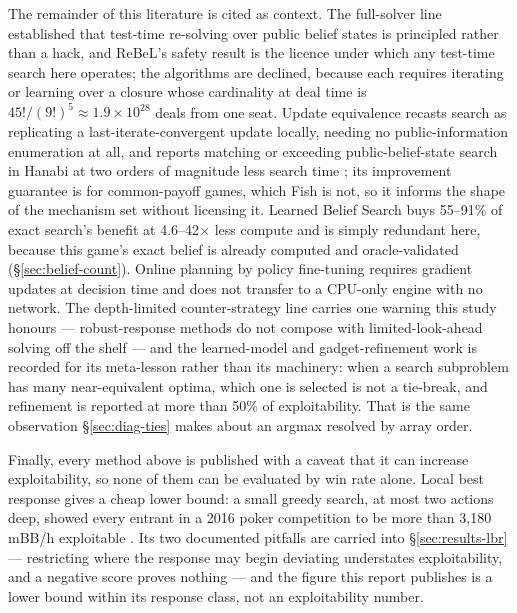 The remainder of this literature is cited as context. The full-solver line
\cite{moravcik2017deepstack,brown2020rebel,schmid2023sog} established that
test-time re-solving over public belief states is principled rather than a hack,
and ReBeL's safety result is the licence under which any test-time search here
operates; the algorithms are declined, because each requires iterating or
learning over a closure whose cardinality at deal time is
$45!/(9!)^5 \approx 1.9 \times 10^{28}$ deals from one seat. Update equivalence
recasts search as replicating a last-iterate-convergent update locally, needing
no public-information enumeration at all, and reports matching or exceeding
public-belief-state search in Hanabi at two orders of magnitude less search time
\cite{sokota2024updateequivalence}; its improvement guarantee is for
common-payoff games, which Fish is not, so it informs the shape of the mechanism
set without licensing it. Learned Belief Search buys 55--91\% of exact search's
benefit at 4.6--42$\times$ less compute \cite{hu2021lbs} and is simply redundant
here, because this game's exact belief is already computed and oracle-validated
(\S\ref{sec:belief-count}). Online planning by policy fine-tuning
\cite{fickinger2021rlfinetuning} requires gradient updates at decision time and
does not transfer to a CPU-only engine with no network. The depth-limited
counter-strategy line \cite{milec2021cdr,milec2025abd} carries one warning this
study honours --- robust-response methods do not compose with limited-look-ahead
solving off the shelf --- and the learned-model and gadget-refinement work
\cite{kubicek2025lamir,kubicek2026refinements} is recorded for its meta-lesson
rather than its machinery: when a search subproblem has many near-equivalent
optima, which one is selected is not a tie-break, and refinement is reported at
more than 50\% of exploitability. That is the same observation
\S\ref{sec:diag-ties} makes about an argmax resolved by array order.

Finally, every method above is published with a caveat that it can increase
exploitability, so none of them can be evaluated by win rate alone. Local best
response gives a cheap lower bound: a small greedy search, at most two actions
deep, showed every entrant in a 2016 poker competition to be more than
3,180\,mBB/h exploitable \cite{lisy2017lbr}. Its two documented pitfalls are
carried into \S\ref{sec:results-lbr} --- restricting where the response may
begin deviating understates exploitability, and a negative score proves nothing
--- and the figure this report publishes is a lower bound within its response
class, not an exploitability number.

